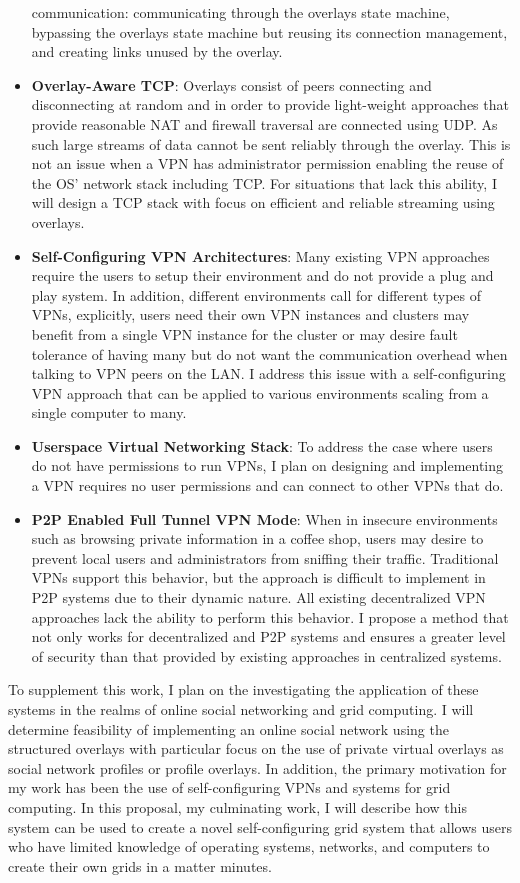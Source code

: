 \begin{itemize}
communication:  communicating through the overlays state machine, bypassing the
overlays state machine but reusing its connection management, and creating
links unused by the overlay.
\item \textbf{Overlay-Aware TCP}: Overlays consist of peers connecting and
disconnecting at random and in order to provide light-weight approaches that
provide reasonable NAT and firewall traversal are connected using UDP.  As such
large streams of data cannot be sent reliably through the overlay.  This is not
an issue when a VPN has administrator permission enabling the reuse of the OS'
network stack including TCP.  For situations that lack this ability, I will
design a TCP stack with focus on efficient and reliable streaming using
overlays.
\item \textbf{Self-Configuring VPN Architectures}: Many existing VPN approaches
require the users to setup their environment and do not provide a plug and play
system.  In addition, different environments call for different types of VPNs,
explicitly, users need their own VPN instances and clusters may benefit from
a single VPN instance for the cluster or may desire fault tolerance of having
many but do not want the communication overhead when talking to VPN peers on
the LAN.  I address this issue with a self-configuring VPN approach that can be
applied to various environments scaling from a single computer to many.
\item \textbf{Userspace Virtual Networking Stack}: To address the case where
users do not have permissions to run VPNs, I plan on designing and implementing
a VPN requires no user permissions and can connect to other VPNs that do.
\item \textbf{P2P Enabled Full Tunnel VPN Mode}: When in insecure environments
such as browsing private information in a coffee shop, users may desire to
prevent local users and administrators from sniffing their traffic.  Traditional
VPNs support this behavior, but the approach is difficult to implement in P2P
systems due to their dynamic nature.  All existing decentralized VPN approaches
lack the ability to perform this behavior.  I propose a method that not only
works for decentralized and P2P systems and ensures a greater level of security
than that provided by existing approaches in centralized systems.
\end{itemize}

To supplement this work, I plan on the investigating the application of these
systems in the realms of online social networking and grid computing.  I will
determine feasibility of implementing an online social network using the 
structured overlays with particular focus on the use of private virtual
overlays as social network profiles or profile overlays.  In addition, the
primary motivation for my work has been the use of self-configuring VPNs and
systems for grid computing.  In this proposal, my culminating work, I will
describe how this system can be used to create a novel self-configuring grid
system that allows users who have limited knowledge of operating systems,
networks, and computers to create their own grids in a matter minutes.

